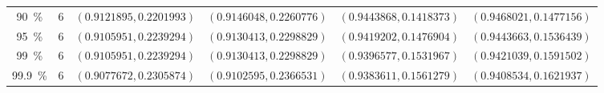 \begin{table}
\begin{tabular}{cccccc}
\cmidrule(lr){1-6}
\SI{90}{\percent} & 6 & $(0.9121895, 0.2201993)$ & $(0.9146048, 0.2260776)$ & $(0.9443868, 0.1418373)$ & $(0.9468021, 0.1477156)$\\
\SI{95}{\percent} & 6 & $(0.9105951, 0.2239294)$ & $(0.9130413, 0.2298829)$ & $(0.9419202, 0.1476904)$ & $(0.9443663, 0.1536439)$\\
\SI{99}{\percent} & 6 & $(0.9105951, 0.2239294)$ & $(0.9130413, 0.2298829)$ & $(0.9396577, 0.1531967)$ & $(0.9421039, 0.1591502)$\\
\SI{99.9}{\percent} & 6 & $(0.9077672, 0.2305874)$ & $(0.9102595, 0.2366531)$ & $(0.9383611, 0.1561279)$ & $(0.9408534, 0.1621937)$\\
\bottomrule
    \end{tabular}
\end{table}
